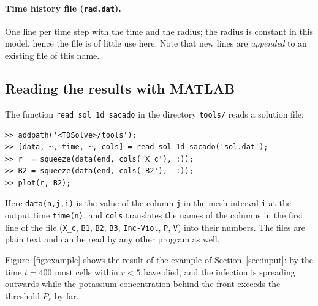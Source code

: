 \documentclass[11pt]{article}
\newcommand{\code}[1]{\texttt{#1}}
\begin{document}
\paragraph{Time history file (\code{rad.dat}).}
One line per time step with the time and the radius; the radius is constant in this model, hence the file is of little use here.
Note that new lines are \emph{appended} to an existing file of this name.

\subsection{Reading the results with MATLAB}
The function \code{read\_sol\_1d\_sacado} in the directory \code{tools/} reads a solution file:
\begin{lstlisting}
>> addpath('<TDSolve>/tools');
>> [data, ~, time, ~, cols] = read_sol_1d_sacado('sol.dat');
>> r  = squeeze(data(end, cols('X_c'), :));
>> B2 = squeeze(data(end, cols('B2'),  :));
>> plot(r, B2);
\end{lstlisting}
Here \code{data(n,j,i)} is the value of the column \code{j} in the mesh interval \code{i} at the output time \code{time(n)}, and \code{cols} translates the names of the columns in the first line of the file (\code{X\_c}, \code{B1}, \code{B2}, \code{B3}, \code{Inc-Viol}, \code{P}, \code{V}) into their numbers.
The files are plain text and can be read by any other program as well.

Figure~\ref{fig:example} shows the result of the example of Section~\ref{sec:input}: by the time $t=400$ most cells within $r<5$ have died, and the infection is spreading outwards while the potassium concentration behind the front exceeds the threshold $P_s$ by far.
\end{document}
